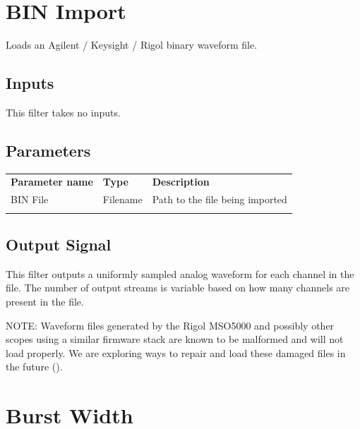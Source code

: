 \pagebreak
\section{BIN Import}

Loads an Agilent / Keysight / Rigol binary waveform file.


\subsection{Inputs}

This filter takes no inputs.

\subsection{Parameters}

\begin{tabularx}{16cm}{llX}
\thickhline
\textbf{Parameter name} & \textbf{Type} & \textbf{Description} \\
\thickhline
BIN File & Filename & Path to the file being imported\\
\thickhline
\end{tabularx}

\subsection{Output Signal}

This filter outputs a uniformly sampled analog waveform for each channel in the file. The number of output streams is
variable based on how many channels are present in the file.

NOTE: Waveform files generated by the Rigol MSO5000 and possibly other scopes using a similar firmware stack are known
to be malformed and will not load properly. We are exploring ways to repair and load these damaged files in the future
().

\pagebreak
\section{Burst Width}

